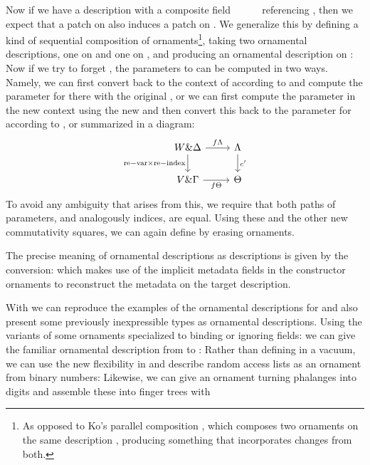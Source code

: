 Now if we have a description  with a composite field \ \ \ \ \  referencing , then we expect that a patch on  also induces a patch on . We generalize this by defining a kind of sequential composition of ornaments\footnote{As opposed to Ko's parallel composition \cite{kophd}, which composes two ornaments on the same description , producing something that incorporates changes from both.}, taking two ornamental descriptions, one on  and one on , and producing an ornamental description on :
Now if we try to forget , the parameters to  can be computed in two ways. Namely, we can first convert back to the context of  according to  and compute the parameter for  there with the original , or we can first compute the parameter in the new context using the new  and then convert this back to the parameter for  according to , or summarized in a diagram:  
\[\begin{tikzcd}
	{W \& \Delta} & \Lambda \\
	{V\& \Gamma} & \Theta
	\arrow["{\mathrm{re-var}\times\mathrm{re-index}}"', from=1-1, to=2-1]
	\arrow["f\Lambda", from=1-1, to=1-2]
	\arrow["f\Theta"', from=2-1, to=2-2]
	\arrow["{c'}", from=1-2, to=2-2]
\end{tikzcd}\]
To avoid any ambiguity that arises from this, we require that both paths of parameters, and analogously indices, are equal. Using these and the other new commutativity squares, we can again define  by erasing ornaments.

The precise meaning of ornamental descriptions as descriptions is given by the conversion:
which makes use of the implicit metadata fields in the constructor ornaments to reconstruct the metadata on the target description.

With  we can reproduce the examples of the ornamental descriptions for  and also present some previously inexpressible types as ornamental descriptions. Using the variants of some ornaments specialized to binding or ignoring fields:
we can give the familiar ornamental description from  to :
Rather than defining  in a vacuum, we can use the new flexibility in  and describe random access lists as an ornament from binary numbers:
Likewise, we can give an ornament turning phalanges into digits
and assemble these into finger trees with 
